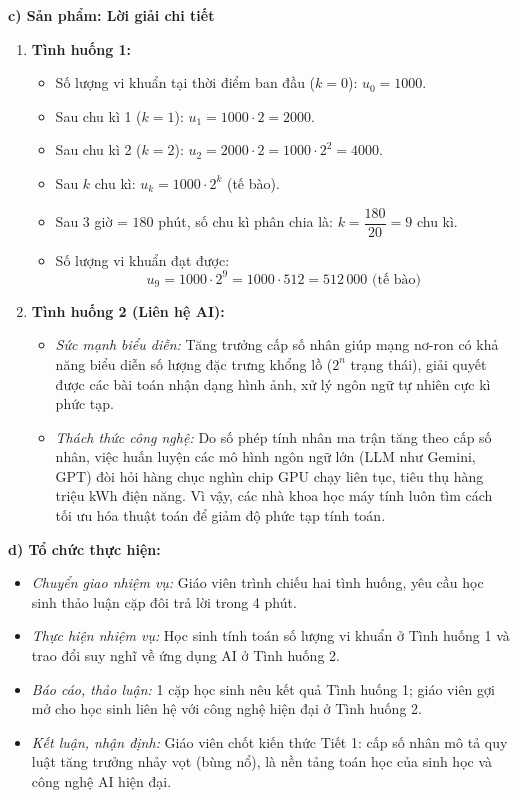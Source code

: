 \documentclass[12pt, a4paper]{article}
\begin{document}
\noindent \textbf{c) Sản phẩm: Lời giải chi tiết}
\begin{enumerate}[leftmargin=0.6cm]
    \item \textbf{Tình huống 1:}
    \begin{itemize}
        \item Số lượng vi khuẩn tại thời điểm ban đầu ($k = 0$): $u_0 = 1000$.
        \item Sau chu kì 1 ($k = 1$): $u_1 = 1000 \cdot 2 = 2000$.
        \item Sau chu kì 2 ($k = 2$): $u_2 = 2000 \cdot 2 = 1000 \cdot 2^2 = 4000$.
        \item Sau $k$ chu kì: $u_k = 1000 \cdot 2^k$ (tế bào).
        \item Sau $3$ giờ = $180$ phút, số chu kì phân chia là: $k = \dfrac{180}{20} = 9$ chu kì.
        \item Số lượng vi khuẩn đạt được:
        $$u_9 = 1000 \cdot 2^9 = 1000 \cdot 512 = 512\,000\text{ (tế bào)}$$
    \end{itemize}
    \item \textbf{Tình huống 2 (Liên hệ AI):}
    \begin{itemize}
        \item \textit{Sức mạnh biểu diễn:} Tăng trưởng cấp số nhân giúp mạng nơ-ron có khả năng biểu diễn số lượng đặc trưng khổng lồ ($2^n$ trạng thái), giải quyết được các bài toán nhận dạng hình ảnh, xử lý ngôn ngữ tự nhiên cực kì phức tạp.
        \item \textit{Thách thức công nghệ:} Do số phép tính nhân ma trận tăng theo cấp số nhân, việc huấn luyện các mô hình ngôn ngữ lớn (LLM như Gemini, GPT) đòi hỏi hàng chục nghìn chip GPU chạy liên tục, tiêu thụ hàng triệu kWh điện năng. Vì vậy, các nhà khoa học máy tính luôn tìm cách tối ưu hóa thuật toán để giảm độ phức tạp tính toán.
    \end{itemize}
\end{enumerate}

\noindent \textbf{d) Tổ chức thực hiện:}
\begin{itemize}[leftmargin=0.8cm]
    \item \textit{Chuyển giao nhiệm vụ:} Giáo viên trình chiếu hai tình huống, yêu cầu học sinh thảo luận cặp đôi trả lời trong 4 phút.
    \item \textit{Thực hiện nhiệm vụ:} Học sinh tính toán số lượng vi khuẩn ở Tình huống 1 và trao đổi suy nghĩ về ứng dụng AI ở Tình huống 2.
    \item \textit{Báo cáo, thảo luận:} 1 cặp học sinh nêu kết quả Tình huống 1; giáo viên gợi mở cho học sinh liên hệ với công nghệ hiện đại ở Tình huống 2.
    \item \textit{Kết luận, nhận định:} Giáo viên chốt kiến thức Tiết 1: cấp số nhân mô tả quy luật tăng trưởng nhảy vọt (bùng nổ), là nền tảng toán học của sinh học và công nghệ AI hiện đại.
\end{itemize}
\end{document}
